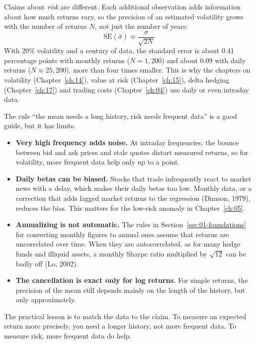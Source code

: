 Claims about \emph{risk} are different. Each additional observation adds information about how much returns vary, so the precision of an estimated volatility grows with the number of returns $N$, not just the number of years:
\begin{equation}
  \mathrm{SE}(\hat{\sigma}) \approx \frac{\sigma}{\sqrt{2N}} \nonumber
\end{equation}
With 20\% volatility and a century of data, the standard error is about 0.41 percentage points with monthly returns ($N = 1{,}200$) and about 0.09 with daily returns ($N \approx 25{,}200$), more than four times smaller. This is why the chapters on volatility (Chapter~\ref{ch:14}), value at risk (Chapter~\ref{ch:15}), delta hedging (Chapter~\ref{ch:17}) and trading costs (Chapter~\ref{ch:04}) use daily or even intraday data.

The rule ``the mean needs a long history, risk needs frequent data'' is a good guide, but it has limits.
\begin{itemize}
  \item \textbf{Very high frequency adds noise.} At intraday frequencies, the bounce between bid and ask prices and stale quotes distort measured returns, so for volatility, more frequent data help only up to a point.
  \item \textbf{Daily betas can be biased.} Stocks that trade infrequently react to market news with a delay, which makes their daily betas too low. Monthly data, or a correction that adds lagged market returns to the regression (Dimson, 1979), reduces the bias. This matters for the low-risk anomaly in Chapter~\ref{ch:05}.
  \item \textbf{Annualizing is not automatic.} The rules in Section~\ref{sec:01-foundations} for converting monthly figures to annual ones assume that returns are uncorrelated over time. When they are autocorrelated, as for many hedge funds and illiquid assets, a monthly Sharpe ratio multiplied by $\sqrt{12}$ can be badly off (Lo, 2002).
  \item \textbf{The cancellation is exact only for log returns.} For simple returns, the precision of the mean still depends mainly on the length of the history, but only approximately.
\end{itemize}

The practical lesson is to match the data to the claim. To measure an expected return more precisely, you need a longer history, not more frequent data. To measure risk, more frequent data do help.


